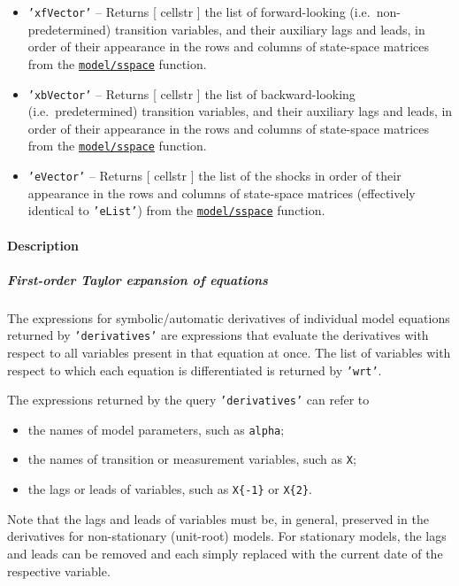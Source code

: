 \begin{itemize}
\item
  \texttt{'xfVector'} -- Returns {[} cellstr {]} the list of
  forward-looking (i.e.~non-predetermined) transition variables, and
  their auxiliary lags and leads, in order of their appearance in the
  rows and columns of state-space matrices from the
  \href{model/sspace}{\texttt{model/sspace}} function.
\item
  \texttt{'xbVector'} -- Returns {[} cellstr {]} the list of
  backward-looking (i.e.~predetermined) transition variables, and their
  auxiliary lags and leads, in order of their appearance in the rows and
  columns of state-space matrices from the
  \href{model/sspace}{\texttt{model/sspace}} function.
\item
  \texttt{'eVector'} -- Returns {[} cellstr {]} the list of the shocks
  in order of their appearance in the rows and columns of state-space
  matrices (effectively identical to \texttt{'eList'}) from the
  \href{model/sspace}{\texttt{model/sspace}} function.
\end{itemize}

\paragraph{Description}

\subparagraph{First-order Taylor expansion of
equations}

The expressions for symbolic/automatic derivatives of individual model
equations returned by \texttt{'derivatives'} are expressions that
evaluate the derivatives with respect to all variables present in that
equation at once. The list of variables with respect to which each
equation is differentiated is returned by \texttt{'wrt'}.

The expressions returned by the query \texttt{'derivatives'} can refer
to

\begin{itemize}
\itemsep1pt\parskip0pt
\item
  the names of model parameters, such as \texttt{alpha};
\item
  the names of transition or measurement variables, such as \texttt{X};
\item
  the lags or leads of variables, such as \texttt{X\{-1\}} or
  \texttt{X\{2\}}.
\end{itemize}

Note that the lags and leads of variables must be, in general, preserved
in the derivatives for non-stationary (unit-root) models. For stationary
models, the lags and leads can be removed and each simply replaced with
the current date of the respective variable.


